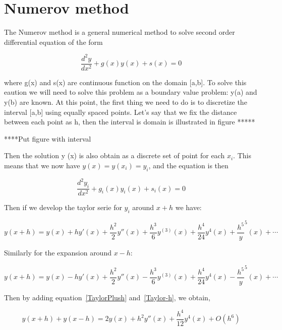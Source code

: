 \documentclass[12pt]{article}
\begin{document}
\tableofcontents
\pagebreak


\section{Numerov method}
The Numerov method is a general numerical method to solve second order differential equation of the form

\begin{equation}
\frac{d^2y}{dx^2}+g(x)y(x)+s(x) = 0
\label{NumerovDifEquation}
\end{equation}

where g(x) and s(x) are continuous function on the domain [a,b]. To solve this eaution we will need to solve this problem as a boundary value problem: y(a) and y(b) are known. At this point,
the first thing we need to do is to discretize the interval [a,b] using equally spaced points. Let's say that we fix the distance between each point as h, then the interval is domain is 
illustrated in figure *****

****Put figure with interval

Then the solution y (x) is also obtain as a discrete set of point for each $x_i$. This means that we now have $y(x)=y(x_i)=y_i$, and the equation is then 

\begin{equation}
\frac{d^2y_i}{dx^2} +g_i(x)y_i(x)+s_i(x) = 0
\label{NumerovEqDiscrete}
\end{equation}

Then if we develop the taylor serie for $y_i$ around $x+h$ we have:

\begin{equation}
y(x+h) = y(x) + hy'(x) + \frac{h^2}{2}y''(x) + \frac{h^3}{6}y^{(3)}(x) + \frac{h^4}{24}y^{4}(x) + \frac{h^5}y^{5}(x) + \cdots
\label{TaylorPlush}
\end{equation}

Similarly for the expansion around $x-h$:

\begin{equation}
y(x+h) = y(x) - hy'(x) + \frac{h^2}{2}y''(x) - \frac{h^3}{6}y^{(3)}(x) + \frac{h^4}{24}y^{4}(x) - \frac{h^5}y^{5}(x) + \cdots
\label{Taylor-h}
\end{equation}

Then by adding equation~\ref{TaylorPlush} and~\ref{Taylor-h}, we obtain, 

\begin{equation}
y(x+h) + y(x-h) = 2y(x) + h^2y''(x) + \frac{h^4}{12}y^{4}(x) + O(h^6)
\label{AddingEq}
\end{equation}
\end{document}
